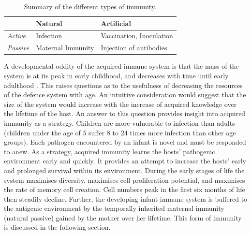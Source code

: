 \begin{table}[ht]
	\centering\small
		\begin{tabular}{lll}
		\toprule
		  & \textbf{Natural} & \textbf{Artificial} \\ 
		\toprule
		\emph{Active}  & Infection & Vaccination, Inoculation \\ 
		\emph{Passive} & Maternal Immunity & Injection of antibodies \\ 
		\bottomrule
		\end{tabular}	
	\caption{Summary of the different types of immunity.}
	\label{tab:hosts:immunisation:types}
\end{table}

A developmental oddity of the acquired immune system is that the mass of the system is at its peak in early childhood, and decreases with time until early adulthood \cite{McDade1999}. This raises questions as to the usefulness of decreasing the resources of the defence system with age. An intuitive consideration would suggest that the size of the system would increase with the increase of acquired knowledge over the lifetime of the host. An answer to this question provides insight into acquired immunity as a strategy. Children are more vulnerable to infection than adults (children under the age of 5 suffer 8 to 24 times more infection than other age groups). Each pathogen encountered by an infant is novel and must be responded to anew. As a strategy, acquired immunity learns the hosts' pathogenic environment early and quickly. It provides an attempt to increase the hosts' early and prolonged survival within its environment. During the early stages of life the system maximises diversity, maximises cell proliferation potential, and maximises the rate of memory cell creation. Cell numbers peak in the first six months of life then steadily decline. Further, the developing infant immune system is buffered to the antigenic environment by the temporally inherited maternal immunity (natural passive) gained by the mother over her lifetime. This form of immunity is discussed in the following section.

%
%
